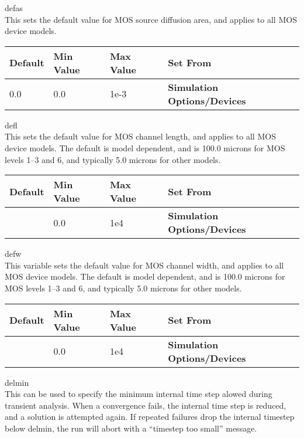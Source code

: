 \begin{description}
\item{\et defas}\\
This sets the default value for MOS source diffusion area, and applies
to all MOS device models.

\begin{tabular}{|l|l|l|l|}\hline
\bf Default & \bf Min Value & \bf Max Value & \bf Set From\\ \hline
0.0 & 0.0 & 1e-3 & \bf Simulation Options/Devices\\ \hline
\end{tabular}
 
\item{\et defl}\\
This sets the default value for MOS channel length, and applies to all
MOS device models.  The default is model dependent, and is 100.0
microns for MOS levels 1--3 and 6, and typically 5.0 microns for other
models.

\begin{tabular}{|l|l|l|l|}\hline
\bf Default & \bf Min Value & \bf Max Value & \bf Set From\\ \hline
 & 0.0 & 1e4 & \bf Simulation Options/Devices\\ \hline
\end{tabular}
 
\item{\et defw}\\
This variable sets the default value for MOS channel width, and
applies to all MOS device models.  The default is model dependent, and
is 100.0 microns for MOS levels 1--3 and 6, and typically 5.0 microns
for other models.

\begin{tabular}{|l|l|l|l|}\hline
\bf Default & \bf Min Value & \bf Max Value & \bf Set From\\ \hline
 & 0.0 & 1e4 & \bf Simulation Options/Devices\\ \hline
\end{tabular}
 
\item{\et delmin}\\
This can be used to specify the minimum internal time step alowed
during transient analysis.  When a convergence fails, the internal
time step is reduced, and a solution is attempted again.  If repeated
failures drop the internal timestep below {\vt delmin}, the run will
abort with a ``timestep too small'' message.


\end{description}
